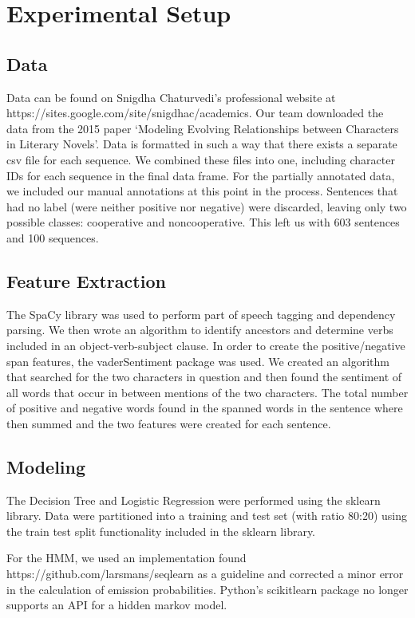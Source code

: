 \documentclass[11pt,a4paper]{article}
\begin{document}
\section{Experimental Setup}

\subsection{Data}
Data can be found on Snigdha Chaturvedi’s professional website at https://sites.google.com/site/snigdhac/academics. Our team downloaded the data from the 2015 paper ‘Modeling Evolving Relationships between Characters in Literary Novels’. Data is formatted in such a way that there exists a separate csv file for each sequence. We combined these files into one, including character IDs for each sequence in the final data frame. For the partially annotated data, we included our manual annotations at this point in the process. Sentences that had no label (were neither positive nor negative) were discarded, leaving only two possible classes: cooperative and noncooperative. This left us with 603 sentences and 100 sequences. 

\subsection{Feature Extraction}
The SpaCy library was used to perform part of speech tagging and dependency parsing. We then wrote an algorithm to identify ancestors and determine verbs included in an object-verb-subject clause. 
In order to create the positive/negative span features, the vaderSentiment package was used. We created an algorithm that searched for the two characters in question and then found the sentiment of all words that occur in between mentions of the two characters. The total number of positive and negative words found in the spanned words in the sentence where then summed and the two features were created for each sentence.

\subsection{Modeling}
The Decision Tree and Logistic Regression were performed using the sklearn library. Data were partitioned into a training and test set (with ratio 80:20) using the train test split functionality included in the sklearn library. 

For the HMM, we used an implementation found https://github.com/larsmans/seqlearn as a guideline and corrected a minor error in the calculation of emission probabilities. Python's scikitlearn package no longer supports an API for a hidden markov model. 
\end{document}
